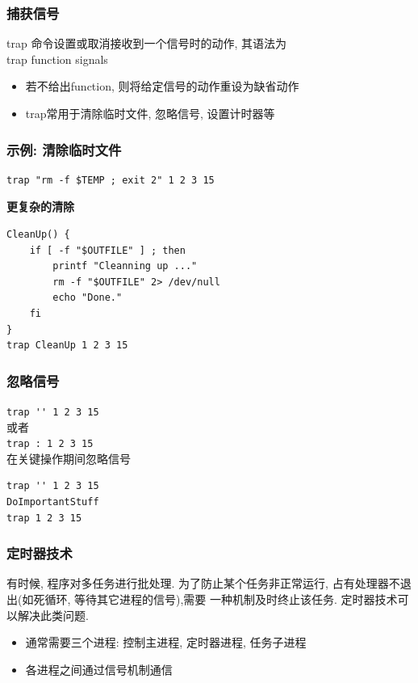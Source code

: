 \documentclass[compress]{beamer}
\begin{document}
\begin{frame}
  \frametitle{捕获信号}

\alert{trap} 命令设置或取消接收到一个信号时的动作, 其语法为\\
trap function signals

\begin{itemize}
\item 若不给出function, 则将给定信号的动作重设为缺省动作
\item \alert{trap}常用于清除临时文件, 忽略信号, 设置计时器等
\end{itemize}
\end{frame}

\begin{frame}[fragile]
\frametitle{示例: 清除临时文件}

\begin{lstlisting}
trap "rm -f $TEMP ; exit 2" 1 2 3 15
\end{lstlisting}
\pause 
\textbf{更复杂的清除} \\
\begin{lstlisting}
CleanUp() {
    if [ -f "$OUTFILE" ] ; then
        printf "Cleanning up ..."
        rm -f "$OUTFILE" 2> /dev/null
        echo "Done."
    fi
}
trap CleanUp 1 2 3 15
\end{lstlisting}
\end{frame}

\begin{frame}[fragile]
\frametitle{忽略信号}

\noindent \verb~trap '' 1 2 3 15~ \\
\pause
\noindent 或者 \\
\noindent \verb~trap : 1 2 3 15~ \\
\pause
\noindent 在关键操作期间忽略信号 \\

\begin{lstlisting}
trap '' 1 2 3 15
DoImportantStuff
trap 1 2 3 15
\end{lstlisting}
\end{frame}

\begin{frame}
\frametitle{定时器技术}
有时候, 程序对多任务进行批处理. 为了防止某个任务非正常运行, 占有处理器不退出(如死循环, 等待其它进程的信号),需要
一种机制及时终止该任务. 定时器技术可以解决此类问题.
\begin{itemize}
\item 通常需要三个进程: 控制主进程, 定时器进程, 任务子进程
\item 各进程之间通过信号机制通信
\end{itemize}
\end{frame}
\end{document}
